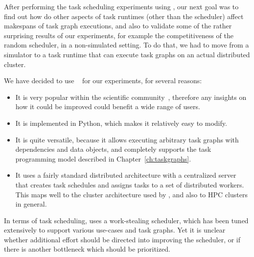
After performing the task scheduling experiments using \estee{}, our next goal
was to find out how do other aspects of task runtimes (other than the scheduler) affect makespans
of task graph executions, and also to validate some of the rather surprising results of our
experiments, for example the competitiveness of the random scheduler, in a non-simulated setting.
To do that, we had to move from a simulator to a task runtime that can execute task graphs on an
actual distributed cluster.

We have decided to use \dask{}~\cite{dask} for our experiments,
for several reasons:
\begin{itemize}
	\setlength\itemsep{0.1em}
	\item It is very popular within the scientific community~\cite{dask-user-survey}, therefore any
	      insights on how it could be improved could benefit a wide range of users.
	\item It is implemented in Python, which makes it relatively easy to modify.
	\item It is quite versatile, because it allows executing arbitrary task graphs with dependencies and data
	      objects, and completely supports the task programming model described in
	      Chapter~\ref{ch:taskgraphs}.
	\item It uses a fairly standard distributed architecture with a centralized server that creates task
	      schedules and assigns tasks to a set of distributed workers. This maps well to the cluster
	      architecture used by \estee{}, and also to HPC clusters in general.
\end{itemize}

In terms of task scheduling, \dask{} uses a work-stealing scheduler, which has
been tuned extensively to support various use-cases and task graphs. Yet it is unclear whether
additional effort should be directed into improving the scheduler, or if there is another
bottleneck which should be prioritized.

